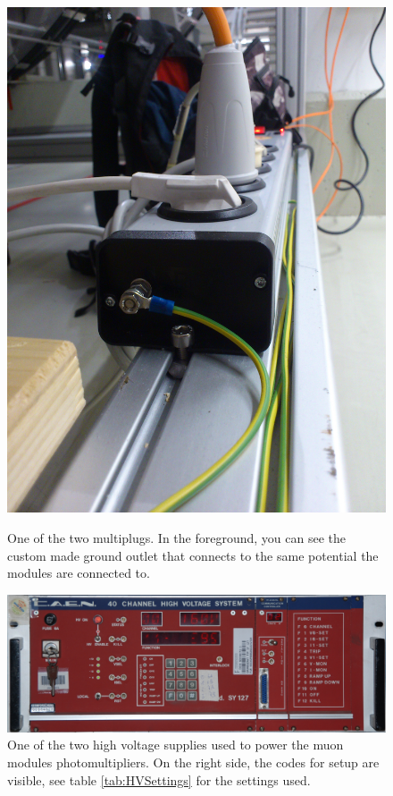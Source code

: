 \begin{figure}
\begin{minipage}{0.69\textwidth}
		\includegraphics[angle = 90, width =\textwidth]{graphics/muonModules/mainSpec/multiplug.jpg}
		\caption[Grounded multiplug]{One of the two multiplugs. In the foreground, you can see the custom made ground outlet that connects to the same potential the modules are connected to.}
		\label{fig:multiplug}
	\end{minipage}
	\includegraphics[width = \textwidth]{graphics/muonModules/mainSpec/HV.jpg}
	\caption[High voltage supplies]{One of the two high voltage supplies used to power the muon modules photomultipliers. On the right side, the codes for setup are visible, see table \ref{tab:HVSettings} for the settings used.}
	\label{fig:HV}
  \end{figure}
